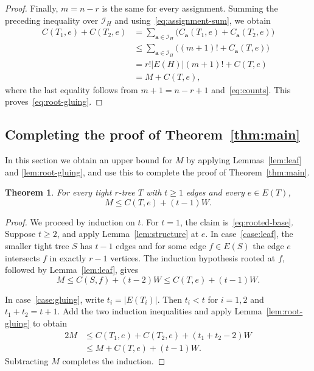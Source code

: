 \documentclass[11pt]{article}
\newtheorem{theorem}{Theorem}[section]
\theoremstyle{remark}
\numberwithin{equation}{section}
\begin{document}
\begin{proof}
		Finally, $m=n-r$ is the same for every assignment. Summing
		the preceding inequality over $\mathcal I_H$ and
		using~\eqref{eq:assignment-sum}, we obtain
		\[
		\begin{aligned}
			C(T_1,e)+C(T_2,e)
			&=
			\sum_{\mathbf a\in\mathcal I_H}
			\bigl(C_{\mathbf a}(T_1,e)+C_{\mathbf a}(T_2,e)\bigr)\\
			&\le
			\sum_{\mathbf a\in\mathcal I_H}
			\bigl((m+1)!+C_{\mathbf a}(T,e)\bigr)\\
			&=
			r!|E(H)|(m+1)!+C(T,e)\\
			&=
			M+C(T,e),
		\end{aligned}
		\]
		where the last equality follows from $m+1=n-r+1$
		and~\eqref{eq:counts}. This proves~\eqref{eq:root-gluing}.

	\end{proof}
	
	\subsection{Completing the proof of Theorem~\ref{thm:main}}\label{subsec:induction}
	In this section we obtain an upper bound for $M$ by applying Lemmas~\ref{lem:leaf} and
	\ref{lem:root-gluing},  and use this to complete the proof of Theorem~\ref{thm:main}.
	
	\begin{theorem}\label{thm:rooted-count}
		For every tight $r$-tree $T$ with $t\ge1$ edges and every
		$e\in E(T)$,
		\begin{equation}\label{eq:rooted-count}
			M\le C(T,e)+(t-1)W.
		\end{equation}
	\end{theorem}
	
	\begin{proof}
		We proceed by induction on $t$. For $t=1$, the claim
		is~\eqref{eq:rooted-base}. Suppose $t\ge2$, and apply
		Lemma~\ref{lem:structure} at $e$. In case~\ref{case:leaf}, the smaller tight tree $S$ has $t-1$
		edges and for some edge $f \in E(S)$ the edge $e$ intersects $f$ in exactly $r - 1$ vertices. The induction hypothesis rooted at $f$, followed by
		Lemma~\ref{lem:leaf}, gives
		\[
		M\le C(S,f)+(t-2)W\le C(T,e)+(t-1)W.
		\]
		
		In case~\ref{case:gluing}, write $t_i=|E(T_i)|$. Then $t_i<t$
		for $i=1,2$ and $t_1+t_2=t+1$. Add the two induction inequalities
		and apply Lemma~\ref{lem:root-gluing} to obtain
		\[
		\begin{aligned}
			2M
			&\le C(T_1,e)+C(T_2,e)+(t_1+t_2-2)W\\
			&\le M+C(T,e)+(t-1)W.
		\end{aligned}
		\]
		Subtracting $M$ completes the induction.
	\end{proof}
	
\end{document}
